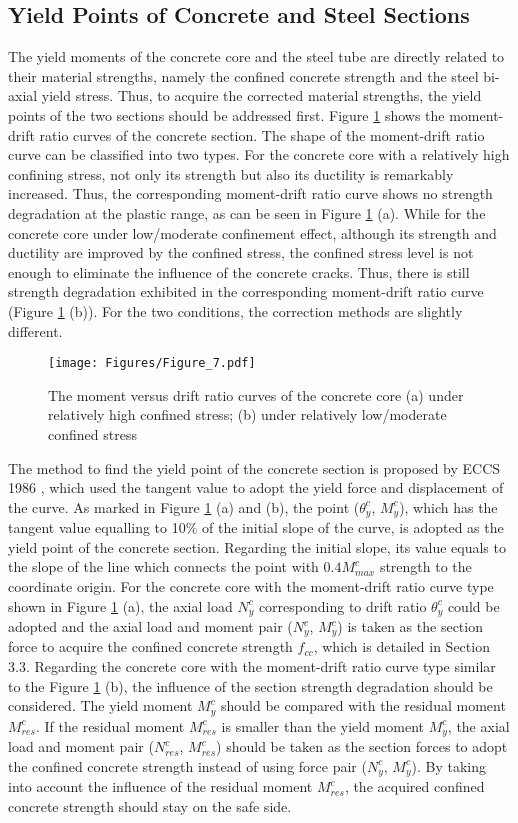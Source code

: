 \documentclass[12pt,a4]{article}
\begin{document}
	\subsection{Yield Points of Concrete and Steel Sections}
	The yield moments of the concrete core and the steel tube are directly related to their material strengths, namely the confined concrete strength and the steel bi-axial yield stress. Thus, to acquire the corrected material strengths, the yield points of the two sections should be addressed first. Figure \ref{fig-6} shows the moment-drift ratio curves of the concrete section. The shape of the moment-drift ratio curve can be classified into two types. For the concrete core with a relatively high confining stress, not only its strength but also its ductility is remarkably increased. Thus, the corresponding moment-drift ratio curve shows no strength degradation at the plastic range, as can be seen in Figure \ref{fig-6} (a). While for the concrete core under low/moderate confinement effect, although its strength and ductility are improved by the confined stress, the confined stress level is not enough to eliminate the influence of the concrete cracks. Thus, there is still strength degradation exhibited in the corresponding moment-drift ratio curve (Figure \ref{fig-6} (b)). For the two conditions, the correction methods are slightly different.
	\par
	\begin{figure}[h]
		\centering
		\texttt{[image: Figures/Figure\_7.pdf]}
		\caption{The moment versus drift ratio curves of the concrete core (a) under relatively high confined stress; (b) under relatively low/moderate confined stress}
		\label{fig-6}
	\end{figure}
	\par
	The method to find the yield point of the concrete section is proposed by ECCS 1986 \cite{RN88}, which used the tangent value to adopt the yield force and displacement of the curve. As marked in Figure \ref{fig-6} (a) and (b), the point ($θ_y^c$, $M_y^c$), which has the tangent value equalling to 10\% of the initial slope of the curve, is adopted as the yield point of the concrete section. Regarding the initial slope, its value equals to the slope of the line which connects the point with $0.4M_{max}^c$ strength to the coordinate origin. For the concrete core with the moment-drift ratio curve type shown in Figure \ref{fig-6} (a), the axial load $N_y^c$ corresponding to drift ratio $θ_y^c$ could be adopted and the axial load and moment pair ($N_y^c$, $M_y^c$) is taken as the section force to acquire the confined concrete strength $f_{cc}$, which is detailed in Section 3.3. Regarding the concrete core with the moment-drift ratio curve type similar to the Figure \ref{fig-6} (b), the influence of the section strength degradation should be considered. The yield moment $M_y^c$ should be compared with the residual moment $M_{res}^c$. If the residual moment $M_{res}^c$ is smaller than the yield moment $M_y^c$, the axial load and moment pair ($N_{res}^c$, $M_{res}^c$) should be taken as the section forces to adopt the confined concrete strength instead of using force pair ($N_y^c$, $M_y^c$). By taking into account the influence of the residual moment $M_{res}^c$, the acquired confined concrete strength should stay on the safe side.
\end{document}
